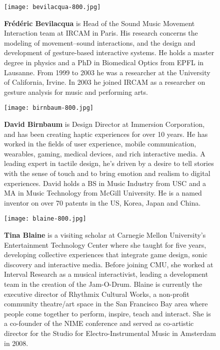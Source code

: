 \begin{authbio}
\begin{figure}[H]
  \sidecaption[t]
  \texttt{[image: bevilacqua-800.jpg]}
  \caption{\textbf{Fr\'ed\'eric Bevilacqua} is Head of the Sound Music Movement Interaction team at IRCAM in Paris. His research concerns the modeling of movement--sound interactions, and the design and development of gesture-based interactive systems. He holds a master degree in physics and a PhD in Biomedical Optics from EPFL in Lausanne. From 1999 to 2003 he was a researcher at the University of California, Irvine. In 2003 he joined IRCAM as a researcher on gesture analysis for music and performing arts.}
\end{figure}

\begin{figure}[H]
  \sidecaption[t]
  \texttt{[image: birnbaum-800.jpg]}
  \caption{\textbf{David Birnbaum} is Design Director at Immersion Corporation, and has been creating haptic experiences for over 10 years. He has worked in the fields of user experience, mobile communication, wearables, gaming, medical devices, and rich interactive media. A leading expert in tactile design, he's driven by a desire to tell stories with the sense of touch and to bring emotion and realism to digital experiences. David holds a BS in Music Industry from USC and a MA in Music Technology from McGill University. He is a named inventor on over 70 patents in the US, Korea, Japan and China.}
\end{figure}

\begin{figure}[H]
  \sidecaption[t]
  \texttt{[image: blaine-800.jpg]}
  \caption{\textbf{Tina Blaine} is a visiting scholar at Carnegie Mellon University's Entertainment Technology Center where she taught for five years, developing collective experiences that integrate game design, sonic discovery and interactive media. Before joining CMU, she worked at Interval Research as a musical interactivist, leading a development team in the creation of the Jam-O-Drum. Blaine is currently the executive director of Rhythmix Cultural Works, a non-profit community theatre/art space in the San Francisco Bay area where people come together to perform, inspire, teach and interact. She is a co-founder of the NIME conference and served as co-artistic director for the Studio for Electro-Instrumental Music in Amsterdam in 2008.}
\end{figure}


\end{authbio}
